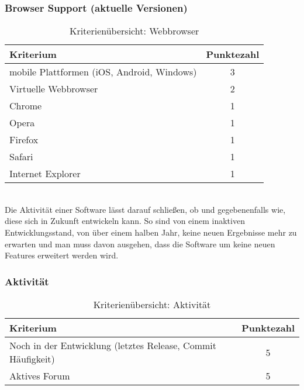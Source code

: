 \subsubsection{Browser Support (aktuelle Versionen)} 
\begin{table}[H]
 	\vspace{-30pt}
 	\centering
		\begin{tabular}{| p{12cm} | c|}
			\hline
				Kriterium		 &	Punktezahl\\
			\hline
			\hline
				mobile Plattformen (iOS, Android, Windows)			&3\\
				Virtuelle \Gls{Webbrowser}	&	2	\\
				Chrome				&	1	\\
				Opera				&	1	\\
				Firefox				&	1	\\
				Safari				&	1	\\
				Internet Explorer		&	1	\\
				\hline
		\end{tabular}
	\caption{Kriterienübersicht: \Gls{Webbrowser}}
\end{table}

\\Die Aktivität einer Software lässt darauf schließen, ob und gegebenenfalls wie, diese sich in Zukunft entwickeln kann. So sind von einem inaktiven Entwicklungsstand, von über einem halben Jahr, keine neuen Ergebnisse mehr zu erwarten und man muss davon ausgehen, dass die Software um keine neuen Features erweitert werden wird.
\subsubsection{Aktivität}
\begin{table}[H]
 	\vspace{-30pt}
 	\centering
		\begin{tabular}{| p{12cm} | c|}
			\hline
				Kriterium		 &	Punktezahl\\
			\hline
			\hline
				Noch in der Entwicklung (letztes Release, \Gls{Commit} Häufigkeit)			&5\\
				Aktives Forum	&	5	\\
				\hline
		\end{tabular}
	\caption{Kriterienübersicht: Aktivität}
\end{table}



	\pagebreak
